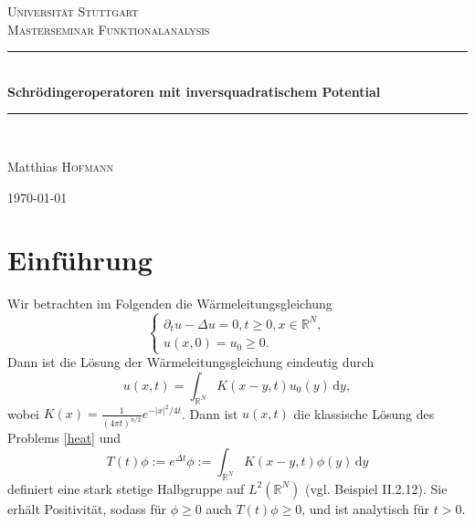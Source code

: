 \documentclass[11pt]{article}
\theoremstyle{break}
\begin{document}
\begin{titlepage}

\begin{center}



\textsc{\LARGE Universität Stuttgart}\\[1.5cm]

\textsc{\Large Masterseminar Funktionalanalysis}\\[0.5cm]


\newcommand{\HRule}{\rule{\linewidth}{0.5mm}}
\HRule \\[0.4cm]
{ \huge \bfseries Schrödingeroperatoren mit inversquadratischem Potential}\\[0.4cm]

\HRule \\[1.5cm]


\begin{center} \Large
Matthias \textsc{Hofmann}
\end{center}

\hfill

\vfill

{\large \today}

\end{center}

\end{titlepage}
\section{Einführung}
Wir betrachten im Folgenden die Wärmeleitungsgleichung
\begin{equation}\label{heat}
\begin{cases}
\partial_t u - \Delta u =0, t\ge 0, x\in \mathbb R^N,\\
u(x,0)=u_0 \ge 0.
\end{cases}
\end{equation}
Dann ist die Lösung der Wärmeleitungsgleichung eindeutig durch
\begin{equation}
u(x,t)=\int_{\mathbb R^N} K(x-y, t) u_0(y) \, \mathrm dy,
\end{equation}
wobei $K(x)=\frac{1}{(4\pi t)^{n/2}} e^{-|x|^2/4t}$. Dann ist $u(x,t)$ die klassische Lösung des Problems \eqref{heat} 
und
\begin{equation}
T(t)\phi:=e^{\Delta t}\phi:=\int_{\mathbb R^N} K(x-y,t) \phi(y)\, \mathrm dy 
\end{equation}
definiert eine stark stetige Halbgruppe auf $L^2(\mathbb R^N)$ (vgl. \cite{engel-nagel} Beispiel II.2.12). Sie erhält Positivität, sodass für $\phi \ge 0$ auch $T(t) \phi \ge 0$, und ist analytisch für $t>0$.
\end{document}
